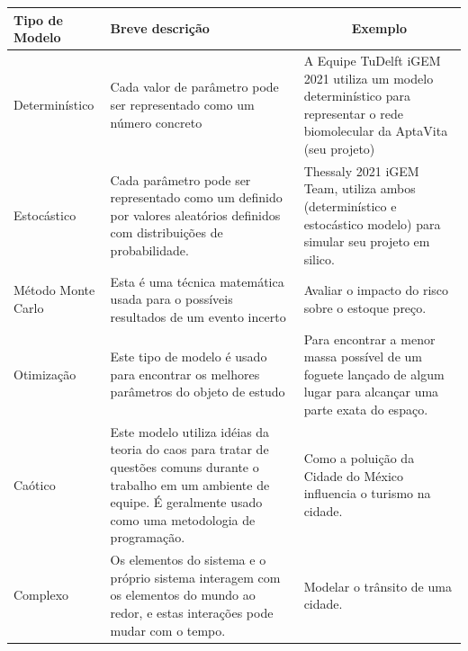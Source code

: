 \documentclass[11pt, letterpaper, portuguese]{article}
\begin{document}
\begin{table}[h]

\begin{tabular}{ | m{3cm} | m{7cm}| m{6.2cm} | } 
\hline
\textbf{Tipo de Modelo} & {\color[HTML]{000000} \textbf{Breve descrição}}                                                                                                    & \multicolumn{1}{c|}{\textbf{Exemplo}}                                  \\ \hline
Determinístico                                 & Cada valor de parâmetro pode ser representado
como um número concreto
                                                                                        & A Equipe TuDelft iGEM 2021 utiliza um modelo determinístico para representar o rede biomolecular da AptaVita
(seu projeto)
 \\ \hline
Estocástico                                    & Cada parâmetro pode ser representado como um definido por valores aleatórios definidos com distribuições de probabilidade.
                                                  & Thessaly 2021 iGEM Team, utiliza ambos (determinístico e estocástico modelo) para simular seu projeto em silico.
             \\ \hline
Método Monte Carlo

                            & Esta é uma técnica matemática usada para o possíveis resultados de um evento incerto
                                                             &   Avaliar o impacto do risco sobre o estoque preço.
 \\ \hline
Otimização                                  & Este tipo de modelo é usado para encontrar os melhores parâmetros do objeto de estudo
                                                                    & Para encontrar a menor massa possível de um foguete lançado de algum lugar para alcançar uma parte exata do espaço.
            \\ \hline
Caótico                                       & Este modelo utiliza idéias da teoria do caos
para tratar de questões comuns durante o trabalho
em um ambiente de equipe. É geralmente usado como
uma metodologia de programação.
 & Como a poluição da Cidade do México influencia o turismo na cidade.                                                             \\ \hline
Complexo                                       & Os elementos do sistema e o próprio sistema interagem com os elementos do mundo ao redor, e estas interações pode mudar com o tempo.   & Modelar o trânsito de uma cidade.                                                                                         \\ \hline
    
\end{tabular}
\end{table}
\end{document}
